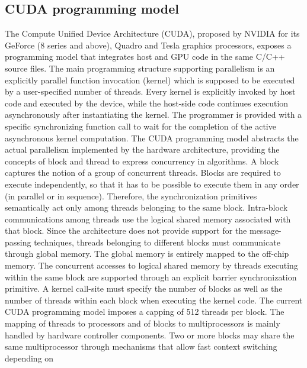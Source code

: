 \subsection{CUDA programming model}
   The Compute Unified Device Architecture (CUDA), proposed by NVIDIA for its GeForce (8 series and above), Quadro and Tesla
graphics processors, exposes a programming model that integrates host and GPU code in the same C/C++ source files.\newline
The main programming structure supporting parallelism is an explicitly parallel function invocation (kernel) which
is supposed to be executed by a user-specified number of threads.
Every kernel is explicitly invoked by host code and executed by the device, while the host-side code continues execution
 asynchronously after instantiating the kernel. The programmer is provided with a specific synchronizing function call
to wait for the completion of the active asynchronous kernel computation.\newline
   The CUDA programming model abstracts the actual parallelism implemented by the hardware architecture,
providing the concepts of block and thread to express concurrency in algorithms.
A block captures the notion of a group of concurrent threads. Blocks are required to execute independently, so that it has
to be possible to execute them in any order (in parallel or in sequence). Therefore, the synchronization primitives semantically
act only among threads belonging to the same block.
Intra-block communications among threads use the logical shared memory associated with that block.\newline
   Since the architecture does not provide support for the message-passing techniques, threads belonging
to different blocks must communicate through global memory. The global memory is entirely mapped to the off-chip memory.
The concurrent accesses to logical shared memory by threads executing within the same block are supported through an explicit
barrier synchronization primitive.\newline
   A kernel call-site must specify the number of blocks as well as the number of threads within each
block when executing the kernel code. The current CUDA programming model imposes a capping of 512 threads per block.\newline
   The mapping of threads to processors and of blocks to multiprocessors is mainly handled by hardware controller components.
Two or more blocks may share the same multiprocessor through mechanisms that allow fast context switching depending on 

